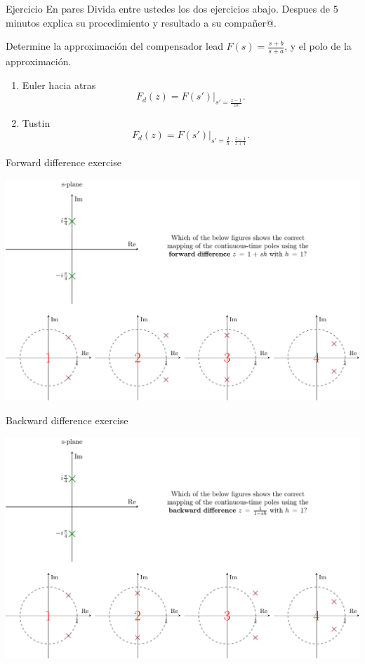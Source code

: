 \documentclass[presentation,aspectratio=1610]{beamer}
\begin{document}
\begin{frame}[label={sec:org87ef9f3}]{Ejercicio}
\alert{En pares} Divida entre ustedes los dos ejercicios abajo. Despues de 5 minutos explica su procedimiento y resultado a su compañer@.

Determine la approximación del compensador lead \(F(s) = \frac{s+b}{s+a}\), y el polo de la approximación.
\begin{enumerate}
\item Euler hacia atras
\[ F_d(z) = F(s')|_{s'=\frac{z-1}{zh}}. \]
\item Tustin
\[ F_d(z) = F(s')|_{s'=\frac{2}{h}\cdot \frac{z-1}{z+1}}. \]
\end{enumerate}
\end{frame}
\begin{frame}[label={sec:orge0775c3}]{Forward difference exercise}
\begin{center}
\includegraphics[width=\linewidth]{../../figures/forward-diff-exercise}
\end{center}
\end{frame}

\begin{frame}[label={sec:orgc9ecb93}]{Backward difference exercise}
\begin{center}
\includegraphics[width=\linewidth]{../../figures/backward-diff-exercise}
\end{center}
\end{frame}
\end{document}

